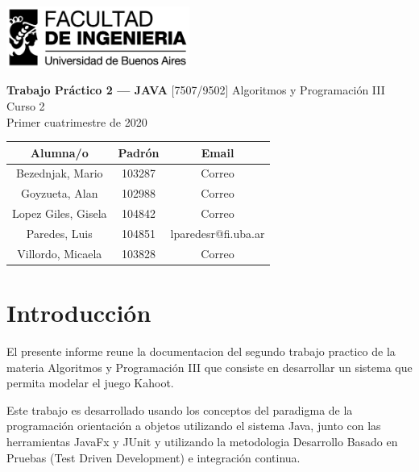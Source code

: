 \documentclass[titlepage,a4paper]{article}
\begin{document}
\begin{titlepage} %
	\hfill\includegraphics[width=6cm]{logofiuba.jpg}
    \centering

    \vfill
    \Huge \textbf{Trabajo Práctico 2 — JAVA}
    \vskip2cm
    \Large [7507/9502] Algoritmos y Programación III\\
    Curso 2 \\ %
    Primer cuatrimestre de 2020 
    \vfill
    
    \begin{tabular}{ | c | c | c |} %
      \hline
      Alumna/o & Padrón & Email \\ \hline
      Bezednjak, Mario & 103287 & Correo \\ \hline
      Goyzueta, Alan & 102988 & Correo \\ \hline
      Lopez Giles, Gisela & 104842 & Correo \\ \hline
	  Paredes, Luis & 104851 & lparedesr@fi.uba.ar\\ \hline
      Villordo, Micaela & 103828 & Correo \\ \hline     
  	\end{tabular}
  	
    \vfill
    \vfill
\end{titlepage}

\tableofcontents %
\newpage

\section{Introducción}\label{sec:intro}
El presente informe reune la documentacion del segundo trabajo practico de la materia Algoritmos y Programación III que consiste en desarrollar un sistema que permita modelar el juego Kahoot.
\newline

Este trabajo es desarrollado usando los conceptos del paradigma de la programación orientación a objetos utilizando el sistema Java, junto con las herramientas JavaFx y JUnit y utilizando la metodologia Desarrollo Basado en Pruebas (Test Driven Development) e integración continua.


\end{document}
